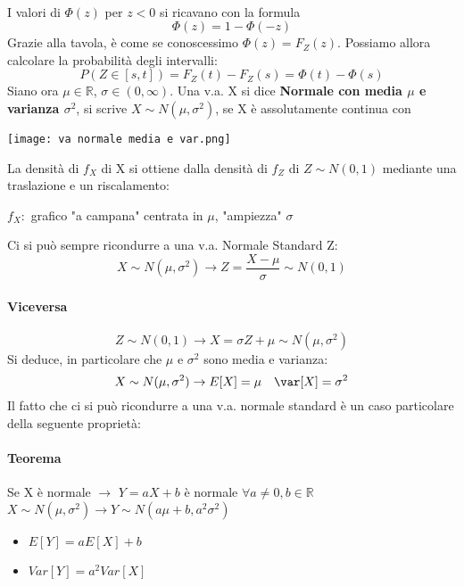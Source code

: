 \\ I valori di $\Phi(z)$ per $z < 0$ si ricavano con la formula
\begin{equation*}
	\Phi(z) = 1 - \Phi(-z)
\end{equation*}
Grazie alla tavola, è come se conoscessimo $\Phi(z) = F_Z(z)$.
Possiamo allora calcolare la probabilità degli intervalli:
\begin{equation*}
	P(Z\in [s,t]) = F_Z(t) - F_Z(s) = \Phi(t) - \Phi(s)
\end{equation*}
Siano ora $\mu \in \mathbb{R}$, $\sigma \in (0, \infty)$.
Una v.a. X si dice \textbf{Normale con media $\mu$ e varianza $\sigma^2$}, si scrive
\textbf{$X \sim N(\mu, \sigma^2)$}, se X è assolutamente continua con
\begin{center}
	\texttt{[image: va normale media e var.png]}
\end{center}
La densità di $f_X$ di X si ottiene dalla densità di $f_Z$ di $Z \sim N(0,1)$
mediante una traslazione e un riscalamento:
\begin{center}
	$f_X:$ grafico "a campana" centrata in $\mu$, "ampiezza" $\sigma$
\end{center}
Ci si può sempre ricondurre a una v.a. Normale Standard Z:
\begin{equation*}
	X \sim N(\mu, \sigma^2) \rightarrow Z = \frac{X-\mu}{\sigma} \sim N(0,1)
\end{equation*}
\paragraph*{Viceversa}
\begin{equation*}
	Z \sim N(0,1) \rightarrow X = \sigma Z + \mu \sim N(\mu, \sigma^2)
\end{equation*}
Si deduce, in particolare che $\mu$ e $\sigma^2$ sono media e varianza:
\begin{equation*}
	X \sim N(\mu, \sigma^2) \rightarrow E[X] = \mu \quad \var[X] = \sigma^2
\end{equation*}
Il fatto che ci si può ricondurre a una v.a. normale standard è un caso particolare
della seguente proprietà:
\paragraph*{Teorema} Se X è normale $\rightarrow$ $Y = aX+b$ è normale
$\forall a \neq 0, b \in \mathbb{R}$
\\ $ X \sim N(\mu, \sigma^2) \rightarrow Y \sim N(a \mu+b, a^2 \sigma^2)$
\begin{itemize}
	\item $E[Y] = aE[X]+b$
	\item $Var[Y] = a^2 Var[X]$
\end{itemize}
